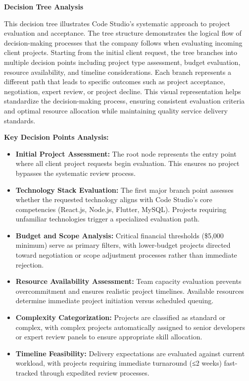 \documentclass[12pt,a4paper]{article}
\begin{document}
{\color{orange!80}\large\textbf{Decision Tree Analysis}}

This decision tree illustrates Code Studio's systematic approach to project evaluation and acceptance. The tree structure demonstrates the logical flow of decision-making processes that the company follows when evaluating incoming client projects. Starting from the initial client request, the tree branches into multiple decision points including project type assessment, budget evaluation, resource availability, and timeline considerations. Each branch represents a different path that leads to specific outcomes such as project acceptance, negotiation, expert review, or project decline. This visual representation helps standardize the decision-making process, ensuring consistent evaluation criteria and optimal resource allocation while maintaining quality service delivery standards.

\textbf{Key Decision Points Analysis:}

\begin{itemize}
\item \textbf{Initial Project Assessment:} The root node represents the entry point where all client project requests begin evaluation. This ensures no project bypasses the systematic review process.

\item \textbf{Technology Stack Evaluation:} The first major branch point assesses whether the requested technology aligns with Code Studio's core competencies (React.js, Node.js, Flutter, MySQL). Projects requiring unfamiliar technologies trigger a specialized evaluation path.

\item \textbf{Budget and Scope Analysis:} Critical financial thresholds (\$5,000 minimum) serve as primary filters, with lower-budget projects directed toward negotiation or scope adjustment processes rather than immediate rejection.

\item \textbf{Resource Availability Assessment:} Team capacity evaluation prevents overcommitment and ensures realistic project timelines. Available resources determine immediate project initiation versus scheduled queuing.

\item \textbf{Complexity Categorization:} Projects are classified as standard or complex, with complex projects automatically assigned to senior developers or expert review panels to ensure appropriate skill allocation.

\item \textbf{Timeline Feasibility:} Delivery expectations are evaluated against current workload, with projects requiring immediate turnaround (≤2 weeks) fast-tracked through expedited review processes.
\end{itemize}
\end{document}
